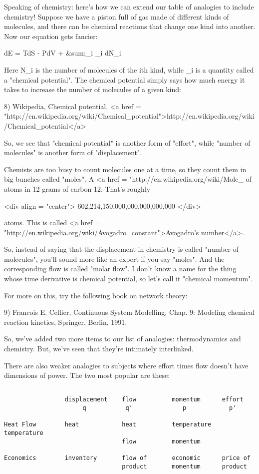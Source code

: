 Speaking of chemistry: here's how we can extend our table of analogies
to include chemistry!  Suppose we have a piston full of gas made of
different kinds of molecules, and there can be chemical reactions that
change one kind into another.  Now our equation gets fancier:

dE = TdS - PdV + &sum;_{i} \mu _{i} dN_{i}

Here N_{i} is the number of molecules of the ith kind, while
\mu _{i} is a quantity called a "chemical potential".
The chemical potential simply says how much energy it takes to
increase the number of molecules of a given kind:

8) Wikipedia, Chemical potential, 
<a href = "http://en.wikipedia.org/wiki/Chemical_potential">http://en.wikipedia.org/wiki/Chemical_potential</a>

So, we see that "chemical potential" is another form of
"effort", while "number of molecules" is another
form of "displacement".

Chemists are too busy to count molecules one at a time, so they count
them in big bunches called "moles".  A <a href =
"http://en.wikipedia.org/wiki/Mole_%
of atoms in 12 grams of carbon-12.  That's roughly

<div align = "center">
                 602,214,150,000,000,000,000,000
</div>

atoms.  This is called <a href =
"http://en.wikipedia.org/wiki/Avogadro_constant">Avogadro's
number</a>.

So, instead of saying that the displacement in chemistry is called
"number of molecules", you'll sound more like an expert if
you say "moles".  And the corresponding flow is called
"molar flow".  I don't know a name for the thing whose time
derivative is chemical potential, so let's call it "chemical
momentum".

For more on this, try the following book on network theory:

9) Francois E. Cellier, Continuous System Modelling, Chap. 9: Modeling
chemical reaction kinetics, Springer, Berlin, 1991.

So, we've added two more items to our list of analogies: thermodynamics
and chemistry.  But, we've seen that they're intimately interlinked.

There are also weaker analogies to subjects where effort times flow
doesn't have dimensions of power.  The two most popular are these:

\begin{verbatim}
    
                 displacement    flow          momentum      effort
                      q           q'              p            p'

Heat Flow        heat            heat          temperature   temperature 
                                 flow          momentum

Economics        inventory       flow of       economic      price of
                                 product       momentum      product

\end{verbatim}
    

